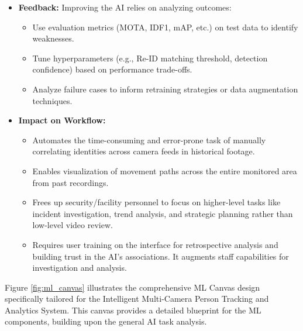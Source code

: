 \begin{itemize}
    \item \textbf{Feedback:} Improving the AI relies on analyzing outcomes:
        \begin{itemize}
            \item Use evaluation metrics (MOTA, IDF1, mAP, etc.) on test data to identify weaknesses.
            \item Tune hyperparameters (e.g., Re-ID matching threshold, detection confidence) based on performance trade-offs.
            \item Analyze failure cases to inform retraining strategies or data augmentation techniques.
        \end{itemize}

    \item \textbf{Impact on Workflow:}
        \begin{itemize}
            \item Automates the time-consuming and error-prone task of manually correlating identities across camera feeds in historical footage.
            \item Enables visualization of movement paths across the entire monitored area from past recordings.
            \item Frees up security/facility personnel to focus on higher-level tasks like incident investigation, trend analysis, and strategic planning rather than low-level video review.
            \item Requires user training on the interface for retrospective analysis and building trust in the AI's associations. It augments staff capabilities for investigation and analysis.
        \end{itemize}
\end{itemize}

Figure \ref{fig:ml_canvas} illustrates the comprehensive ML Canvas design specifically tailored for the Intelligent Multi-Camera Person Tracking and Analytics System. This canvas provides a detailed blueprint for the ML components, building upon the general AI task analysis.

